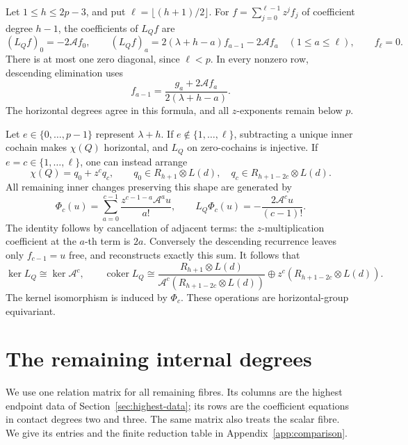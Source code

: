 \documentclass[11pt]{article}
\theoremstyle{plain}
\theoremstyle{definition}
\theoremstyle{remark}
\numberwithin{equation}{section}
\newcommand{\coker}{\operatorname{coker}}
\begin{document}
Let \(1\le h\le2p-3\), and put \(\ell=\lfloor(h+1)/2\rfloor\).
For \(f=\sum_{j=0}^{\ell-1}z^jf_j\) of coefficient degree \(h-1\),
the coefficients of \(L_Qf\) are
\begin{equation}\label{eq:Q-triangular-coefficients}
 (L_Qf)_0=-2\mathcal A f_0,\qquad
 (L_Qf)_a=2(\lambda+h-a)f_{a-1}-2\mathcal A f_a
       \quad(1\le a\le\ell),\qquad f_\ell=0 .
\end{equation}
There is at most one zero diagonal, since \(\ell<p\).
In every nonzero row, descending elimination uses
\[
 f_{a-1}=\frac{g_a+2\mathcal A f_a}{2(\lambda+h-a)} .
\]
The horizontal degrees agree in this formula, and all \(z\)-exponents
remain below \(p\).

Let \(e\in\{0,\ldots,p-1\}\) represent \(\lambda+h\).
If \(e\notin\{1,\ldots,\ell\}\), subtracting a unique inner cochain
makes \(\chi(Q)\) horizontal, and \(L_Q\) on zero-cochains is injective.
If \(e=c\in\{1,\ldots,\ell\}\), one can instead arrange
\[
 \chi(Q)=q_0+z^cq_c,\qquad
 q_0\in R_{h+1}\otimes L(d),\quad
 q_c\in R_{h+1-2c}\otimes L(d).
\]
All remaining inner changes preserving this shape are generated by
\begin{equation}\label{eq:Q-residual-gauge}
 \Phi_c(u)=\sum_{a=0}^{c-1}
       \frac{z^{c-1-a}\mathcal A^a u}{a!},\qquad
 L_Q\Phi_c(u)=-\frac{2\mathcal A^cu}{(c-1)!}.
\end{equation}
The identity follows by cancellation of adjacent terms:
the \(z\)-multiplication coefficient at the \(a\)-th term is \(2a\).
Conversely the descending recurrence leaves only \(f_{c-1}=u\)
free, and reconstructs exactly this sum.
It follows that
\[
 \ker L_Q\cong\ker\mathcal A^c,\qquad
 \coker L_Q\cong
 \frac{R_{h+1}\otimes L(d)}
      {\mathcal A^c(R_{h+1-2c}\otimes L(d))}
       \oplus z^c(R_{h+1-2c}\otimes L(d)).
\]
The kernel isomorphism is induced by \(\Phi_c\).
These operations are horizontal-group equivariant.

\section{The remaining internal degrees}\label{sec:positive-fibres}

We use one relation matrix for all remaining fibres. Its columns are
the highest endpoint data of Section~\ref{sec:highest-data}; its rows
are the coefficient equations in contact degrees two and three.
The same matrix also treats the scalar fibre. We give its entries and
the finite reduction table in Appendix~\ref{app:comparison}.
\end{document}

